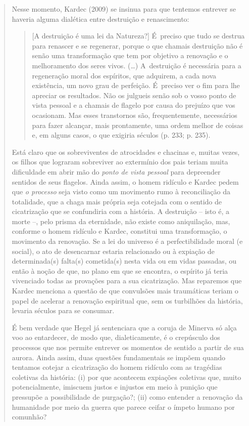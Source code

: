 {\begin{quote}
Nesse momento, Kardec (2009) se insinua para que tentemos entrever se
haveria alguma dialética entre destruição e renascimento:

\begin{quote}
{[}A destruição é uma lei da Natureza?{]} É~preciso que tudo se destrua
para renascer e se regenerar, porque o que chamais destruição não é
senão uma transformação que tem por objetivo a renovação e o
melhoramento dos seres vivos. (\ldots{}) A~destruição é necessária para
a regeneração moral dos espíritos, que adquirem, a cada nova existência,
um novo grau de perfeição. É~preciso ver o fim para lhe apreciar os
resultados. Não os julgueis senão sob o vosso ponto de vista pessoal e a
chamais de flagelo por causa do prejuízo que vos ocasionam. Mas esses
transtornos são, frequentemente, necessários para fazer alcançar, mais
prontamente, uma ordem melhor de coisas e, em alguns casos, o que
exigiria séculos (p. 233; p. 235).
\end{quote}

Está claro que os sobreviventes de atrocidades e chacinas e, muitas
vezes, os filhos que lograram sobreviver ao extermínio dos pais teriam
muita dificuldade em abrir mão do \emph{ponto de vista pessoal} para
depreender sentidos de seus flagelos. Ainda assim, o homem ridículo e
Kardec pedem que \emph{o processo} seja visto como um movimento rumo à
reconciliação da totalidade, que a chaga mais própria seja cotejada com
o sentido de cicatrização que se confundiria com a história. A
destruição -- isto é, a morte --, pelo prisma da eternidade, não existe
como aniquilação, mas, conforme o homem ridículo e Kardec, constitui uma
transformação, o movimento da renovação. Se a lei do universo é a
perfectibilidade moral (e social), o ato de desencarnar estaria
relacionado ou à expiação de determinada(s) falta(s) cometida(s) nesta
vida ou em vidas passadas, ou então à noção de que, no plano em que se
encontra, o espírito já teria vivenciado todas as provações para a sua
cicatrização. Mas reparemos que Kardec menciona a questão de que
convulsões mais traumáticas teriam o papel de acelerar a renovação
espiritual que, sem os turbilhões da história, levaria séculos para se
consumar.

É bem verdade que Hegel já sentenciara que a coruja de Minerva só alça
voo ao entardecer, de modo que, dialeticamente, é o crepúsculo dos
processos que nos permite entrever os momentos de sentido a partir de
sua aurora. Ainda assim, duas questões fundamentais se impõem quando
tentamos cotejar a cicatrização do homem ridículo com as tragédias
coletivas da história: (i) por que acontecem expiações coletivas que,
muito potencialmente, imiscuem justos e injustos em meio à punição que
pressupõe a possibilidade de purgação?; (ii) como entender a renovação
da humanidade por meio da guerra que parece ceifar o ímpeto humano por
comunhão?


\end{quote}}
